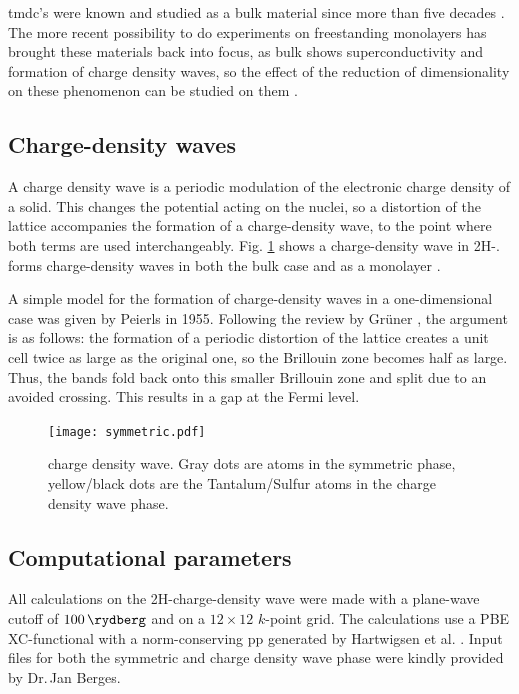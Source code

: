 \documentclass[main.tex]{subfiles}
\begin{document}
\acrshort{tmdc}'s were known and studied as a bulk material since more than five decades \cite{wilson_transition_1969}.
The more recent possibility to do experiments on freestanding monolayers \cite{novoselov_two-dimensional_2005} has brought these materials back into focus,  as bulk \TaS shows superconductivity and formation of charge density waves, so the effect of the reduction of dimensionality on these phenomenon can be studied on them \cite{navarro-moratalla_enhanced_2016}.

\subsection{Charge-density waves}

A charge density wave is a periodic modulation of the electronic charge density of a solid.
This changes the potential acting on the nuclei, so a distortion of the lattice accompanies the formation of a charge-density wave, to the point where both terms are used interchangeably.
Fig. \ref{fig:tas2_cdw_structure} shows a charge-density wave in 2H-\TaS.
\TaS forms charge-density waves in both the bulk case \cite{wilson_charge-density_1974} and as a monolayer \cite{hall_environmental_2019}.

A simple model for the formation of charge-density waves in a one-dimensional case was given by Peierls in 1955.
Following the review by Grüner \cite{gruner_dynamics_1988}, the argument is as follows: 
the formation of a periodic distortion of the lattice creates a unit cell twice as large as the original one, so the Brillouin zone becomes half as large.
Thus, the bands fold back onto this smaller Brillouin zone and split due to an avoided crossing.
This results in a gap at the Fermi level.

\begin{figure}[h]
    \centering
    \texttt{[image: symmetric.pdf]}
    \caption{\TaS charge density wave. Gray dots are atoms in the symmetric phase, yellow/black dots are the Tantalum/Sulfur atoms in the charge density wave phase.}
    \label{fig:tas2_cdw_structure}
\end{figure}


\subsection{Computational parameters}

All calculations on the 2H-\TaS charge-density wave were made with a plane-wave cutoff of \(\SI{100}{\rydberg}\) and on a \(12\times12\) \(k\)-point grid.
The calculations use a PBE XC-functional with a norm-conserving \acrshort{pp} generated by Hartwigsen et al. \cite{hartwigsen_relativistic_1998}.
Input files for both the symmetric and charge density wave phase were kindly provided by Dr.\,Jan Berges.
\end{document}
